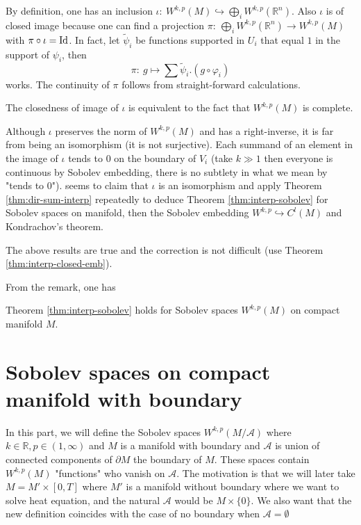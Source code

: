 By definition, one has an inclusion \(\iota:\ W^{k,p}(M) \hookrightarrow \bigoplus_i
W^{k,p}(\mathbb{R}^n)\). Also \(\iota\) is of closed image because one can find a
projection \(\pi:\ \bigoplus_i W^{k,p}(\mathbb{R}^n) \longrightarrow W^{k,p}(M)\) with \(\pi\circ \iota = {\rm Id}\). In fact, let \(\tilde \psi_i\) be functions supported in \(U_i\) that equal \(1\) in the support of \(\psi_i\), then 
\[ 
\pi:\ g\mapsto \sum \tilde \psi_i. (g\circ \varphi_i) 
\]
works. The continuity of \(\pi\) follows from straight-forward calculations.

The closedness of image of \(\iota\) is equivalent to the fact that \(W^{k,p}(M)\) is complete.

\begin{remark}
\label{rem:hamilton-typo}
Although \(\iota\) preserves the norm of \(W^{k,p}(M)\) and has a right-inverse, it is far
from being an isomorphism (it is not surjective). Each summand of an element in the
image of \(\iota\) tends to 0 on the boundary of \(V_i\) (take \(k \gg 1\) then everyone
is continuous by Sobolev embedding, there is no subtlety in what we mean by "tends to
0"). \cite[page 54]{hamilton_harmonic_1975} seems to claim that \(\iota\) is an
isomorphism and apply Theorem \ref{thm:dir-sum-interp}
repeatedly to deduce Theorem \ref{thm:interp-sobolev} for Sobolev spaces on manifold,
then the Sobolev embedding \(W^{k,p} \hookrightarrow C^{l}(M)\) and Kondrachov's
theorem.

The above results are true and the correction is not difficult (use Theorem \ref{thm:interp-closed-emb}).
\end{remark}

From the remark, one has
\begin{theorem}
\label{thm:interp-sobolev-M}
Theorem \ref{thm:interp-sobolev} holds for Sobolev spaces \(W^{k,p}(M)\) on compact
manifold \(M\).
\end{theorem}


\section{Sobolev spaces on compact manifold with boundary}
\label{sec:orgd932199}

In this part, we will define the Sobolev spaces \(W^{k,p}(M/ \mathcal{A})\) where \(k\in
\mathbb{R}, p\in(1, \infty)\) and \(M\)
is a manifold with boundary and \(\mathcal{A}\) is union of connected components of \(\partial M\) the boundary of \(M\). These spaces contain \(W^{k,p}(M)\) "functions" who vanish
on \(\mathcal{A}\). The motivation is that we will later
take \(M = M'\times [0,T]\) where \(M'\) is a manifold without boundary where we want
to solve heat equation, and the natural \(\mathcal{A}\) would be \(M \times
\{0\}\). We also want that the new definition coincides with the case of no boundary
when \(\mathcal{A} = \emptyset\)


